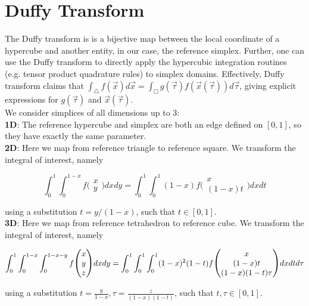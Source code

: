 \section{Duffy Transform}
\label{section-abstract-duffy-transform}

The Duffy transform is is a bijective map between the local coordinate of a hypercube and another entity, in our case, the reference simplex. Further, one can use the Duffy transform to directly apply the hypercubic integration routines (e.g. tensor product quadrature rules) to simplex domains. Effectively, Duffy transform claims that $ \int_{\triangle} f(\vec{x}) d\vec{x} = \int_{\Box} g(\vec{\tau}) f(\vec{x}(\vec{\tau})) d\vec{\tau}$, giving explicit expressions for $g(\vec{\tau})$ and $\vec{x}(\vec{\tau})$. \\

\noindent
We consider simplices of all dimensions up to 3: \\

\noindent
\textbf{1D}: The reference hypercube and simplex are both an edge defined on $[0, 1]$, so they have exactly the same parameter. \\

\noindent
\textbf{2D}: Here we map from reference triangle to reference square. We transform the integral of interest, namely

\[ \int_0^1 \int_0^{1-x} f \biggl(
\begin{matrix}  x \\ y  \end{matrix} \biggr)
 dx dy = \int_0^1 \int_0^1 (1-x) 
f \biggl( \begin{matrix} x \\ (1-x)t \end{matrix} \biggr)
dx dt \]

\noindent
using a substitution $t = y / (1 - x)$, such that $t \in [0, 1]$. \\

\noindent
\textbf{3D}: Here we map from reference tetrahedron to reference cube. We transform the integral of interest, namely

\[ \int_0^1 \int_0^{1-x} \int_0^{1-x-y} f \scalebox{1.2}{\Bigg(}
\begin{matrix}  x \\ y \\ z  \end{matrix} \scalebox{1.2}{\Bigg)}
dx dy = \int_0^1 \int_0^1 \int_0^1 (1-x)^2 (1-t)
f \scalebox{1.2}{\Bigg(} \begin{matrix}  x \\ (1-x)t \\ (1-x)(1-t)\tau  \end{matrix} \scalebox{1.2}{\Bigg)}
dx dt d\tau \]

\noindent
using a substitution $t = \frac{y}{1 - x}, \tau = \frac{z}{(1 - x)(1 - t)}$, such that $t,\tau \in [0, 1]$. \\